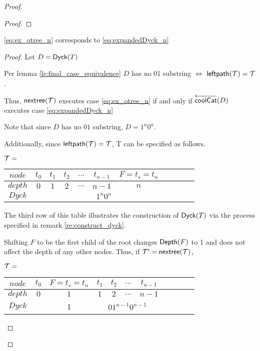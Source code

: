 \begin{proof}
\begin{proof}





\end{proof}
\begin{lemma}
    \ref{eq:ex_otree_n} corresponds to \ref{eq:expandedDyck_n}
\end{lemma}
\begin{proof}

    Let $D=\mathsf{Dyck}{(T)}$

    Per lemma \ref{le:final_case_equivalence} $D$ has no 01 substring $\iff$ $\mathsf{leftpath}{(\mathcal{T})}=\mathcal{T}$.  

    Thus, $\mathsf{nextree}{(\mathcal{T})}$ executes case \ref{eq:ex_otree_n} if and only if $\overleftarrow{\mathsf{coolCat}}{(D)}$ executes case  \ref{eq:expandedDyck_n}

    Note that since $D$ has no $01$ substring, $D=1^n0^n$. 

    Additionally, since $\mathsf{leftpath}{(\mathcal{T})}=\mathcal{T}$, T can be specified as follows.

    $\mathcal{T}=$
    \begin{center}
	\begin{tabular}{ |c|c|c|c|c|c|c|c|c|c|c| } 
	    \hline

	    $node$ & $t_0$ & $t_1$  & $t_2$ & $\dots$ & $t_{n-1}$&$F=t_s=t_n$  \\
	    \hline
	    $depth$ & $0$ & $1$ & $2$ & $\dots$ & $n-1$ & $n$ \\
	    \hline
	    $Dyck$ &  &  \multicolumn{5}{|c|}{$1^n0^n$} \\
	    \hline
	\end{tabular}
    \end{center}

    The third row of this table illustrates the construction of $\mathsf{Dyck}{(T)}$ via the process specified in remark \ref{re:construct_dyck}.

    Shifting $F$ to be the first child of the root changes $\mathsf{Depth}{(F)}$ to 1 and does not affect the depth of any other nodes.  Thus, if $\mathcal{T}'=\mathsf{nextree}{(\mathcal{T})}$, 


    $\mathcal{T}=$
    \begin{center}
	\begin{tabular}{ |c|c|c|c|c|c|c|c|c|c|c| } 
	    \hline

	    $node$ & $t_0$ & $F=t_s=t_n$ & $t_1$  & $t_2$ & $\dots$ & $t_{n-1}$  \\
	    \hline
	    $depth$ & $0$ & $1$ & $1$ & $2$ & $\dots$ & $n-1$ \\
	    \hline
	    $Dyck$ &  &  1 &  \multicolumn{4}{|c|}{$01^{n-1}0^{n-1}$} \\
	    \hline
	\end{tabular}
    \end{center}


\end{proof}
\end{proof}
